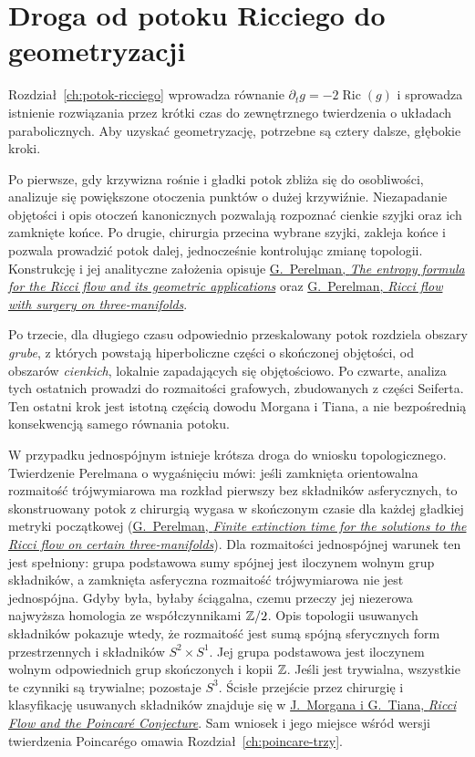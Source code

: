 \section{Droga od potoku Ricciego do geometryzacji}
\label{sec:thurston-ricci-outline}

Rozdział~\ref{ch:potok-ricciego} wprowadza równanie
$\partial_tg=-2\operatorname{Ric}(g)$ i sprowadza istnienie
rozwiązania przez krótki czas do zewnętrznego twierdzenia
o układach parabolicznych. Aby uzyskać geometryzację,
potrzebne są cztery dalsze, głębokie kroki.

Po pierwsze, gdy krzywizna rośnie i gładki potok zbliża się
do osobliwości, analizuje się powiększone otoczenia punktów
o dużej krzywiźnie. Niezapadanie objętości i opis otoczeń
kanonicznych pozwalają rozpoznać cienkie szyjki oraz ich
zamknięte końce. Po drugie, chirurgia przecina wybrane szyjki,
zakleja końce i pozwala prowadzić potok dalej, jednocześnie
kontrolując zmianę topologii. Konstrukcję i jej analityczne
założenia opisuje
\href{https://arxiv.org/pdf/math/0211159}
{G.\ Perelman, \emph{The entropy formula for the Ricci flow and
its geometric applications}} oraz
\href{https://arxiv.org/pdf/math/0303109}
{G.\ Perelman, \emph{Ricci flow with surgery on three-manifolds}}.

Po trzecie, dla długiego czasu odpowiednio przeskalowany
potok rozdziela obszary \emph{grube}, z których powstają
hiperboliczne części o skończonej objętości, od obszarów
\emph{cienkich}, lokalnie zapadających się objętościowo.
Po czwarte, analiza tych ostatnich prowadzi do rozmaitości
grafowych, zbudowanych z części Seiferta. Ten ostatni krok
jest istotną częścią dowodu Morgana i Tiana, a nie
bezpośrednią konsekwencją samego równania potoku.

W przypadku jednospójnym istnieje krótsza droga do wniosku
topologicznego. Twierdzenie Perelmana o wygaśnięciu mówi:
jeśli zamknięta orientowalna rozmaitość trójwymiarowa ma rozkład
pierwszy bez składników asferycznych, to skonstruowany
potok z chirurgią wygasa w skończonym czasie dla każdej
gładkiej metryki początkowej
(\href{https://arxiv.org/pdf/math/0307245}
{G.\ Perelman, \emph{Finite extinction time for the solutions
to the Ricci flow on certain three-manifolds}}).
Dla rozmaitości jednospójnej warunek ten jest spełniony:
grupa podstawowa sumy spójnej jest iloczynem wolnym grup
składników, a zamknięta asferyczna rozmaitość trójwymiarowa nie jest
jednospójna. Gdyby była, byłaby ściągalna, czemu przeczy
jej niezerowa najwyższa homologia ze współczynnikami $\mathbb{Z}/2$.
Opis topologii usuwanych składników pokazuje
wtedy, że rozmaitość jest sumą spójną sferycznych form
przestrzennych i składników $S^2\times S^1$.
Jej grupa podstawowa jest iloczynem wolnym odpowiednich
grup skończonych i kopii $\mathbb{Z}$. Jeśli jest trywialna,
wszystkie te czynniki są trywialne; pozostaje $S^3$.
Ścisłe przejście przez chirurgię i klasyfikację usuwanych
składników znajduje się w
\href{https://www.claymath.org/wp-content/uploads/2022/03/Ricci-pdf.pdf}
{J.\ Morgana i G.\ Tiana, \emph{Ricci Flow and the Poincaré
Conjecture}}. Sam wniosek i jego miejsce wśród wersji
twierdzenia Poincarégo omawia Rozdział~\ref{ch:poincare-trzy}.

